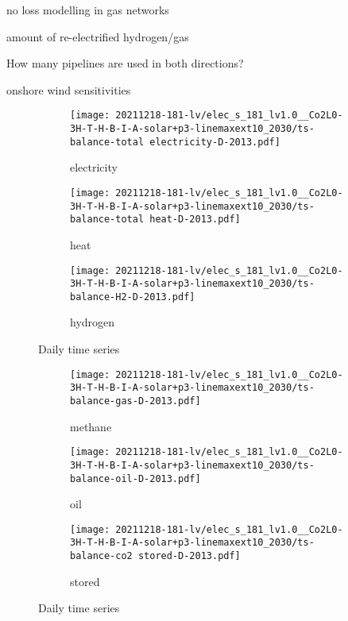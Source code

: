 no loss modelling in gas networks

amount of re-electrified hydrogen/gas

How many pipelines are used in both directions?

onshore wind sensitivities



\begin{figure}
    \centering
    \begin{subfigure}[t]{\textwidth}
        \centering
        \caption{electricity}
        \texttt{[image: 20211218-181-lv/elec\_s\_181\_lv1.0\_\_Co2L0-3H-T-H-B-I-A-solar+p3-linemaxext10\_2030/ts-balance-total electricity-D-2013.pdf]}
    \end{subfigure}
    \begin{subfigure}[t]{\textwidth}
        \centering
        \caption{heat}
        \texttt{[image: 20211218-181-lv/elec\_s\_181\_lv1.0\_\_Co2L0-3H-T-H-B-I-A-solar+p3-linemaxext10\_2030/ts-balance-total heat-D-2013.pdf]}
    \end{subfigure}
    \begin{subfigure}[t]{\textwidth}
        \centering
        \caption{hydrogen}
        \texttt{[image: 20211218-181-lv/elec\_s\_181\_lv1.0\_\_Co2L0-3H-T-H-B-I-A-solar+p3-linemaxext10\_2030/ts-balance-H2-D-2013.pdf]}
    \end{subfigure}
    \caption{Daily time series}
    \label{fig:eligibility}
\end{figure}

\begin{figure}
    \centering
    \begin{subfigure}[t]{\textwidth}
        \centering
        \caption{methane}
        \texttt{[image: 20211218-181-lv/elec\_s\_181\_lv1.0\_\_Co2L0-3H-T-H-B-I-A-solar+p3-linemaxext10\_2030/ts-balance-gas-D-2013.pdf]}
    \end{subfigure}
    \begin{subfigure}[t]{\textwidth}
        \centering
        \caption{oil}
        \texttt{[image: 20211218-181-lv/elec\_s\_181\_lv1.0\_\_Co2L0-3H-T-H-B-I-A-solar+p3-linemaxext10\_2030/ts-balance-oil-D-2013.pdf]}
    \end{subfigure}
    \begin{subfigure}[t]{\textwidth}
        \centering
        \caption{stored \co}
        \texttt{[image: 20211218-181-lv/elec\_s\_181\_lv1.0\_\_Co2L0-3H-T-H-B-I-A-solar+p3-linemaxext10\_2030/ts-balance-co2 stored-D-2013.pdf]}
    \end{subfigure}
    \caption{Daily time series}
    \label{fig:eligibility}
\end{figure}


